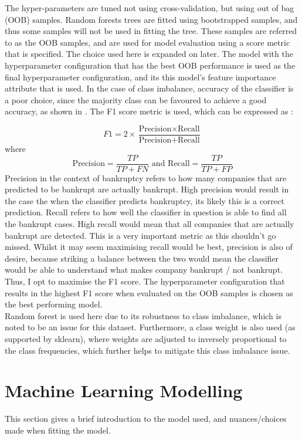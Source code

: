 \documentclass[11pt]{article}
\begin{document}
The hyper-parameters are tuned not using cross-validation, but using out of bag (OOB) samples. Random forests trees are fitted using bootstrapped samples, and thus some samples will not be used in fitting the tree. These samples are referred to as the OOB samples, and are used for model evaluation using a score metric that is specified. The choice used here is expanded on later. The model with the hyperparameter configuration that has the best OOB performance is used as the final hyperparameter configuration, and its this model's feature importance attribute that is used. In the case of class imbalance, accuracy of the classifier is a poor choice, since the majority class can be favoured to achieve a good accuracy, as shown in \cite{accuracy_misleading}. The F1 score metric is used, which can be expressed as : 

\begin{equation}
F1 = 2 \times \frac{\text{Precision} \times \text{Recall}}{\text{Precision}+\text{Recall}} 
\label{F1Score}
\end{equation}
where 
$$
\text{Precision} = \frac{TP}{TP+FN} \text{   and   } \text{Recall} = \frac{TP}{TP + FP}
$$
Precision in the context of bankruptcy refers to how many companies that are predicted to be bankrupt are actually bankrupt. High precision would result in the case the when the classifier predicts bankruptcy, its likely this is a correct prediction. Recall refers to how well the classifier in question is able to find all the bankrupt cases. High recall would mean that all companies that are actually bankrupt are detected. This is a very important metric as this shouldn't go missed. Whilst it may seem maximising recall would be best, precision is also of desire, because striking a balance between the two would mean the classifier would be able to understand what makes company bankrupt / not bankrupt. Thus, I opt to maximise the F1 score. The hyperparameter configuration that results in the highest F1 score when evaluated on the OOB samples is chosen as the best performing model. \\

Random forest is used here due to its robustness to class imbalance, which is noted to be an issue for this dataset. Furthermore, a class weight is also used (as supported by sklearn), where weights are adjusted to inversely proportional to the class frequencies, which further helps to mitigate this class imbalance issue. 

\section{Machine Learning Modelling}\label{modelling}
This section gives a brief introduction to the model used, and nuances/choices made when fitting the model.
\end{document}
